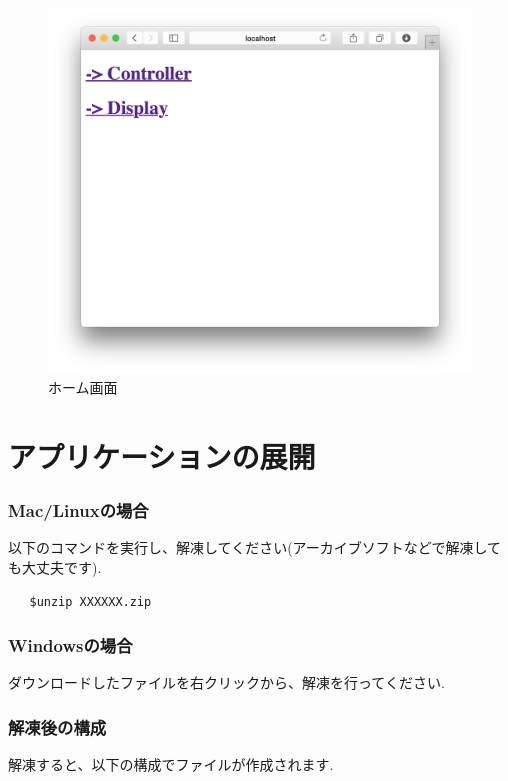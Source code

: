 \documentclass[a4paper,10pt,oneside]{jsbook}
\begin{document}
\begin{figure}[htbp]
	\begin{center}
		\includegraphics[width=11.5cm]{image/home.png}
	\end{center}
	\caption{ホーム画面}
	\label{fig:home}
\end{figure}


\chapter{アプリケーションの展開}

\subsection{Mac/Linuxの場合}
以下のコマンドを実行し、解凍してください(アーカイブソフトなどで解凍しても大丈夫です).\\
\begin{verbatim}
   $unzip XXXXXX.zip
\end{verbatim}


\subsection{Windowsの場合}
ダウンロードしたファイルを右クリックから、解凍を行ってください.\\


\subsection{解凍後の構成}
解凍すると、以下の構成でファイルが作成されます.\\
\end{document}
